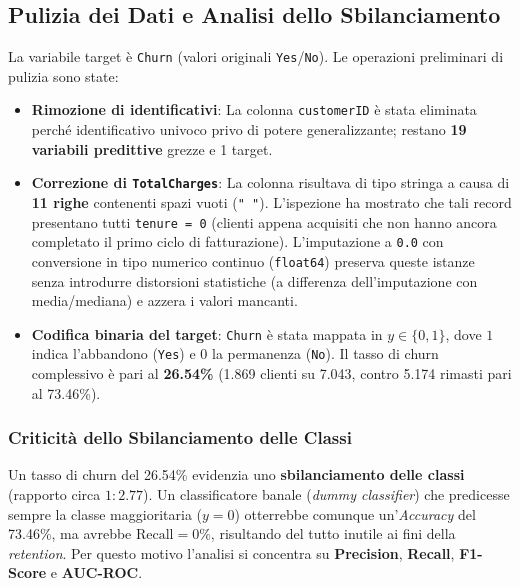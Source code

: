 \documentclass[11pt,a4paper]{article}
\begin{document}
\subsection{Pulizia dei Dati e Analisi dello Sbilanciamento}
La variabile target è \texttt{Churn} (valori originali \texttt{Yes}/\texttt{No}). Le operazioni preliminari di pulizia sono state:
\begin{itemize}
    \item \textbf{Rimozione di identificativi}: La colonna \texttt{customerID} è stata eliminata perché identificativo univoco privo di potere generalizzante; restano \textbf{19 variabili predittive} grezze e 1 target.
    \item \textbf{Correzione di \texttt{TotalCharges}}: La colonna risultava di tipo stringa a causa di \textbf{11 righe} contenenti spazi vuoti (\texttt{" "}). L'ispezione ha mostrato che tali record presentano tutti \texttt{tenure = 0} (clienti appena acquisiti che non hanno ancora completato il primo ciclo di fatturazione). L'imputazione a \texttt{0.0} con conversione in tipo numerico continuo (\texttt{float64}) preserva queste istanze senza introdurre distorsioni statistiche (a differenza dell'imputazione con media/mediana) e azzera i valori mancanti.
    \item \textbf{Codifica binaria del target}: \texttt{Churn} è stata mappata in $y \in \{0, 1\}$, dove $1$ indica l'abbandono (\texttt{Yes}) e $0$ la permanenza (\texttt{No}). Il tasso di churn complessivo è pari al \textbf{26.54\%} (1.869 clienti su 7.043, contro 5.174 rimasti pari al 73.46\%).
\end{itemize}

\subsubsection{Criticità dello Sbilanciamento delle Classi}
Un tasso di churn del 26.54\% evidenzia uno \textbf{sbilanciamento delle classi} (rapporto circa $1:2.77$). Un classificatore banale (\textit{dummy classifier}) che predicesse sempre la classe maggioritaria ($y=0$) otterrebbe comunque un'\textit{Accuracy} del 73.46\%, ma avrebbe $\text{Recall} = 0\%$, risultando del tutto inutile ai fini della \textit{retention}. Per questo motivo l'analisi si concentra su \textbf{Precision}, \textbf{Recall}, \textbf{F1-Score} e \textbf{AUC-ROC}.
\end{document}
